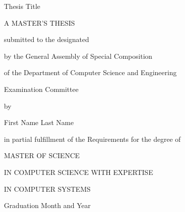 \thispagestyle{empty}
\begin{center}
	{\LARGE Thesis Title}
	\par
	\vspace{2.5cm} {\Large A MASTER'S THESIS}
	
	\vspace{1.25cm} {\Large submitted to the designated}
	
	\vspace{0.75cm} {\Large by the General Assembly of Special Composition}
	
	\vspace{0.25cm} {\Large of the Department of Computer Science and Engineering}
	
	\vspace{0.25cm} {\Large Examination Committee}
	
	\vspace{1.25cm} {\Large by}
	
	\vspace{1.75cm} {\LARGE First Name Last Name}
	
	\vspace{1.25cm} {\Large in partial fulfillment of the Requirements for the degree of}
	
	\vspace{1.75cm} {\Large MASTER OF SCIENCE}
	
	\vspace{0.5cm} {\Large IN COMPUTER SCIENCE WITH EXPERTISE}
	
	\vspace{0.5cm} {\Large IN COMPUTER SYSTEMS}
	\par
	\vfill {\Large Graduation Month and Year}
\end{center}